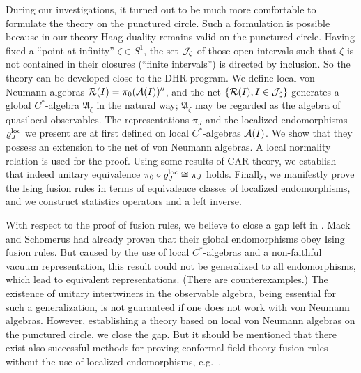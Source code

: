 \documentclass[10pt,a4paper]{article}
\begin{document}
During our investigations, it
turned out to be much more comfortable to formulate the
theory on the punctured circle. Such a formulation is
possible because in our theory Haag duality remains
valid on the punctured circle. Having fixed a ``point
at infinity'' $\zeta\in S^1$, the set
${\cal J}_\zeta$ of those open intervals
such that $\zeta$ is not contained in their
closures (``finite intervals'') is directed
by inclusion. So the theory can be developed
close to the DHR program. We define local von
Neumann algebras ${\cal R}(I)=\pi_0({\cal A}(I))''$,
and the net $\{{\cal R}(I),I\in{\cal J}_\zeta\}$
generates a global $C^*$-algebra $\mathfrak{A}_\zeta$
in the natural way; $\mathfrak{A}_\zeta$ may be
regarded as the algebra of quasilocal observables.
The representations $\pi_J$ and the
localized endomorphisms $\varrho_J^{\rm loc}$
we present are at first defined on local
$C^*$-algebras ${\cal A}(I)$. We show that they
possess an extension to the net of von Neumann
algebras. A local normality relation is used
for the proof. Using some results of CAR theory,
we establish that indeed unitary equivalence
$\pi_0\circ\varrho_J^{\rm loc}\cong\pi_J$ holds.
Finally, we manifestly prove the Ising fusion
rules in terms of equivalence classes of localized
endomorphisms, and we construct statistics
operators and a left inverse.

With respect to the proof of fusion rules, we
believe to close a gap left in \cite{MS1,MS2}.
Mack and Schomerus had already proven that their
global endomorphisms obey Ising fusion rules.
But caused by the use of local $C^*$-algebras and
a non-faithful vacuum representation, this result
could not be generalized to all endomorphisms,
which lead to equivalent representations. (There
are counterexamples.) The existence of unitary
intertwiners in the observable algebra, being
essential for such a generalization, is not
guaranteed if one does not work with von Neumann
algebras. However, establishing a theory based
on local von Neumann algebras on the punctured
circle, we close the gap. But it should be
mentioned that there exist also successful
methods for proving conformal field theory
fusion rules without the use of localized
endomorphisms, e.g.~\cite{Loke,Wass}.
\end{document}
